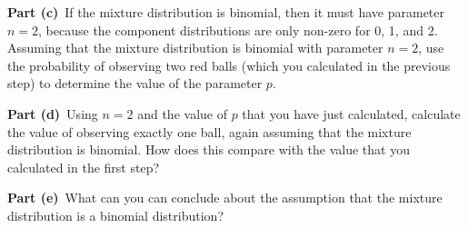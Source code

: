 \documentclass[12pt]{article}
\theoremstyle{definition}
\begin{document}
\newpage
\noindent
{\bf Part (c)}\ If the mixture distribution is binomial, then it must have parameter $n = 2$, because the component distributions are only non-zero for 0, 1, and 2. Assuming that the  mixture distribution is binomial with parameter $n = 2$, use the probability of observing two red balls (which you calculated in the previous step) to determine the value of the parameter $p$.

\vspace{3in}
\noindent
{\bf Part (d)}\ Using $n = 2$ and the value of $p$ that you have just calculated, calculate the value of observing exactly one ball, again assuming that the mixture distribution is binomial. How does this compare with the value that you calculated in the first step?

\newpage
\noindent
{\bf Part (e)}\ What can you can conclude about the assumption that the mixture distribution is a binomial distribution?
\end{document}

